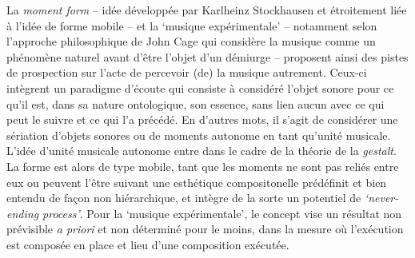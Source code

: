 \documentclass{article}
\begin{document}
%
%
%

La \textsl{moment form} -- idée développée par Karlheinz Stockhausen et étroitement liée à l'idée de forme mobile  -- et la `musique expérimentale' -- notamment selon l'approche philosophique de John Cage qui considère la musique comme un phénomène naturel avant d'être l'objet d'un démiurge -- proposent ainsi des pistes de prospection sur l'acte de percevoir (de) la musique autrement. Ceux-ci intègrent un paradigme d'écoute qui consiste à considéré l'objet sonore pour ce qu'il est, dans sa nature ontologique, son essence, sans lien aucun %
avec ce qui peut le suivre et ce qui l'a précédé. 
En d'autres mots, il s'agit de considérer une sériation d'objets sonores ou de moments %
autonome en tant qu'unité musicale. %
L'idée d'unité musicale autonome entre dans le cadre de la théorie de la \textit{gestalt}\label{efn:gestalt}. %
La forme est alors de type mobile, tant que les moments ne sont pas reliés entre eux ou peuvent l'être suivant une esthétique compositonelle prédéfinit et bien entendu de façon non hiérarchique, et intègre de la sorte un potentiel de \textsl{`never-ending process'}.
Pour la `musique expérimentale', le concept vise un résultat non prévisible \textit{a priori} et non déterminé pour le moins, dans la mesure où l'exécution est composée en place et lieu d'une composition exécutée. %
\end{document}
